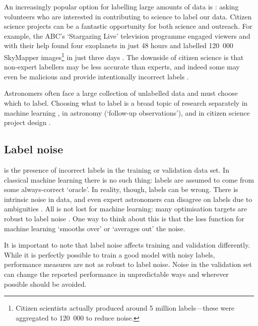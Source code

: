         An increasingly popular option for labelling large amounts of data is : asking volunteers who are interested in contributing to science to label our data. Citizen science projects can be a fantastic opportunity for both science and outreach. For example, the ABC's `Stargazing Live' television programme engaged viewers and with their help found four exoplanets in just 48 hours \citep{miller_stargazing_2017} and labelled 120~000 SkyMapper images\footnote{Citizen scientists actually produced around 5 million labels---these were aggregated to 120~000 to reduce noise.} in just three days \citep{tucker_stargazing_2017}. The downside of citizen science is that non-expert labellers may be less accurate than experts, and indeed some may even be malicious and provide intentionally incorrect labels \citep{zhang_learning_2016}.

        Astronomers often face a large collection of unlabelled data and must choose which to label. Choosing what to label is a broad topic of research separately in machine learning \citep[often called active learning e.g.][]{gilyazev_active_2018}, in astronomy (`follow-up observations'), and in citizen science project design \citep[e.g. citizen science project Snapshot Serengeti found that showing volunteers \emph{uninteresting} images helped retain engagement;][]{sieland_snapshot_2015}.

    \subsection{Label noise}
    \label{sec:label-noise}

         is the presence of incorrect labels in the training or validation data set. In classical machine learning there is no such thing: labels are assumed to come from some always-correct `oracle'. In reality, though, labels can be wrong. There is intrinsic noise in data, and even expert astronomers can disagree on labels due to ambiguities \citep[e.g. around 10 per cent of Radio Galaxy Zoo is extremely divisive amongst expert labellers;][]{banfield15}. All is not lost for machine learning: many optimisation targets are robust to label noise \citep{menon15cpe}. One way to think about this is that the loss function for machine learning `smooths over' or `averages out' the noise.

        It is important to note that label noise affects training and validation differently. While it is perfectly possible to train a good model with noisy labels, performance measures are not as robust to label noise. Noise in the validation set can change the reported performance in unpredictable ways and wherever possible should be avoided.

